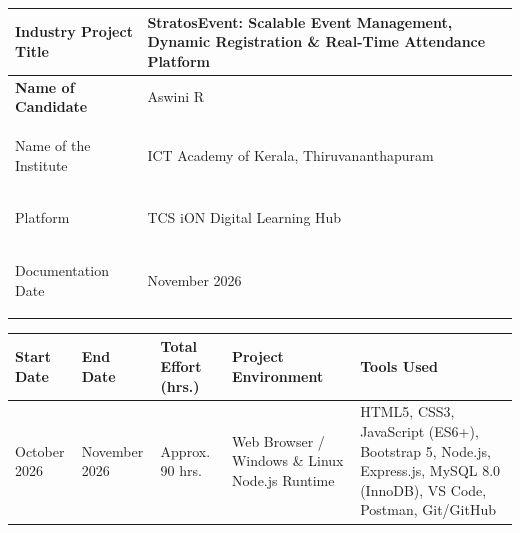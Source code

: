 \documentclass[11pt,a4paper]{article}
\begin{document}
\noindent
\begin{tabularx}{\textwidth}{
  |>{\raggedright\arraybackslash\bfseries}p{}
  |>{\raggedright\arraybackslash}X|
}

\hline

\cellcolor{LabelBlue}
Industry Project Title &
StratosEvent: Scalable Event Management, Dynamic Registration \& Real-Time Attendance Platform
\\\hline

\cellcolor{LabelBlue}
Name of Candidate &
\cellcolor{RowGray}Aswini R
\\\hline

\cellcolor{LabelBlue}
Name of the Institute &
ICT Academy of Kerala, Thiruvananthapuram 
\\\hline

\cellcolor{LabelBlue}
Platform &
\cellcolor{RowGray}TCS iON Digital Learning Hub
\\\hline

\cellcolor{LabelBlue}
Documentation Date &
November 2026
\\\hline

\end{tabularx}

\endgroup

\vspace{0.36in}

\begingroup

\fontsize{9.5}{11.5}\selectfont
\renewcommand{\arraystretch}{1.55}
\setlength{\tabcolsep}{5pt}

\noindent
\begin{tabularx}{\textwidth}{
  |>{\raggedright\arraybackslash}p{}
  |>{\raggedright\arraybackslash}p{}
  |>{\raggedright\arraybackslash}p{}
  |>{\raggedright\arraybackslash}p{}
  |>{\raggedright\arraybackslash}X|
}

\hline

\rowcolor{TCSBlue}

\color{white}\bfseries Start Date &
\color{white}\bfseries End Date &
\color{white}\bfseries Total Effort (hrs.) &
\color{white}\bfseries Project Environment &
\color{white}\bfseries Tools Used
\\\hline

October 2026 &
November 2026 &
Approx. 90 hrs. &
Web Browser / Windows \& Linux Node.js Runtime &
HTML5, CSS3, JavaScript (ES6+), Bootstrap 5, Node.js, Express.js, MySQL 8.0 (InnoDB), VS Code, Postman, Git/GitHub
\\\hline

\end{tabularx}
\end{document}
